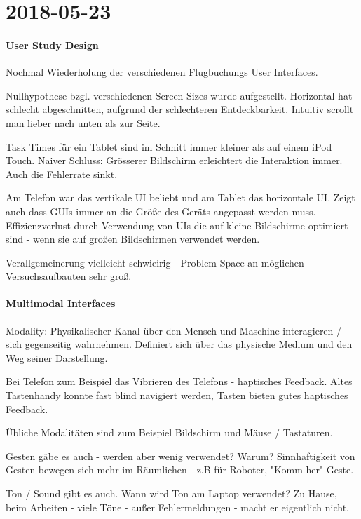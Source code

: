 \section{2018-05-23}

\paragraph{User Study Design}

Nochmal Wiederholung der verschiedenen Flugbuchungs User Interfaces.

Nullhypothese bzgl. verschiedenen Screen Sizes wurde aufgestellt. Horizontal hat schlecht
abgeschnitten, aufgrund der schlechteren Entdeckbarkeit. Intuitiv scrollt man lieber nach
unten als zur Seite. 

Task Times für ein Tablet sind im Schnitt immer kleiner als auf einem iPod Touch. Naiver
Schluss: Grösserer Bildschirm erleichtert die Interaktion immer. Auch die Fehlerrate
sinkt. 

Am Telefon war das vertikale UI beliebt und am Tablet das horizontale UI. Zeigt auch dass
GUIs immer an die Größe des Geräts angepasst werden muss. Effizienzverlust durch
Verwendung von UIs die auf kleine Bildschirme optimiert sind - wenn sie auf großen
Bildschirmen verwendet werden. 

Verallgemeinerung vielleicht schwieirig - Problem Space an möglichen Versuchsaufbauten
sehr groß.

\paragraph{Multimodal Interfaces}
Modality: Physikalischer Kanal über den Mensch und Maschine interagieren / sich
gegenseitig wahrnehmen. 
Definiert sich über das physische Medium und den Weg seiner Darstellung.

Bei Telefon zum Beispiel das Vibrieren des Telefons - haptisches Feedback. Altes
Tastenhandy konnte fast blind navigiert werden, Tasten bieten gutes haptisches Feedback. 

Übliche Modalitäten sind zum Beispiel Bildschirm und Mäuse / Tastaturen. 

Gesten gäbe es auch - werden aber wenig verwendet? Warum? Sinnhaftigkeit von Gesten
bewegen sich mehr im Räumlichen - z.B für Roboter, "Komm her" Geste. 

Ton / Sound gibt es auch. Wann wird Ton am Laptop verwendet? Zu Hause, beim Arbeiten -
viele Töne - außer Fehlermeldungen - macht er eigentlich nicht. 

